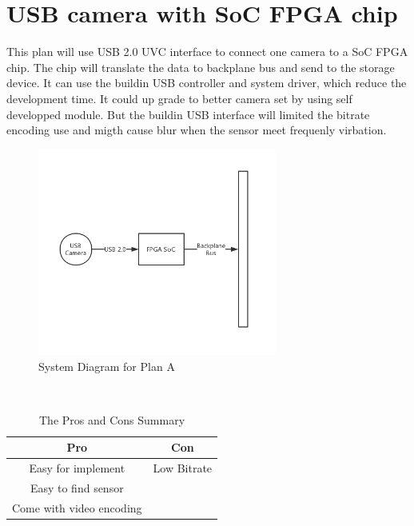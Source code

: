 \documentclass[12pt,article]{memoir}
\begin{document}
\section{USB camera with SoC FPGA chip}
This plan will use USB 2.0 UVC interface to connect one camera to a SoC FPGA chip. The chip will translate the data to backplane bus and send to the storage device. It can use the buildin USB controller and system driver, which reduce the development time. It could up grade to better camera set by using self developped module. But the buildin USB interface will limited the bitrate encoding use and migth cause blur when the sensor meet frequenly virbation.\\
\begin{figure}[htp]
\begin{center}
\includegraphics[width=0.7\textwidth]{DR00002_Plan1.png}
 \caption{System Diagram for Plan A}	
\end{center}
\end{figure}
\\
\begin{table}[H]
	\centering
		\begin{tabu}{c | c }
		Pro & Con \\ \hline
		Easy for implement & Low Bitrate \\
		Easy to find sensor &  \\
		Come with video encoding &  \\
		\end{tabu}
	\caption{The Pros and Cons Summary}
\end{table}
\newpage
\end{document}
